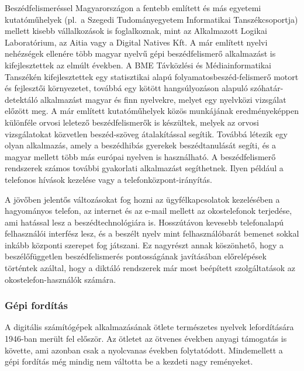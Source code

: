 \begin{multicols}{2}
  Beszédfelismeréssel Magyarországon a fentebb említett és más egyetemi ku\-ta\-tó\-mű\-he\-lyek (pl.~a Szegedi Tu\-do\-mány\-egye\-tem Informatikai Tanszékcsoportja) mellett kisebb vállalkozások is foglalkoznak, mint az Alkalmazott Logikai La\-bo\-ra\-tó\-ri\-um, az Aitia vagy a Digital Natives Kft. A már említett nyelvi nehézségek ellenére több magyar nyelvű gépi beszédfelismerő alkalmazást is kifejlesztettek az elmúlt években. A BME Távközlési és Mé\-dia\-in\-for\-ma\-ti\-kai Tanszékén kifejlesztettek egy statisztikai alapú folyamatosbeszéd-felismerő motort és fejlesztői környezetet, továbbá egy kötött hangsúlyozáson alapuló szóhatár-detektáló alkalmazást ma\-gyar és finn nyelvekre, melyet egy nyelv\-kö\-zi vizsgálat előzött meg. A már említett kutatóműhelyek közös munkájának eredményeképpen különféle orvosi leletező beszédfelismerők is készültek, melyek az orvosi vizsgálatokat közvetlen beszéd-szöveg átalakítással segítik. Továbbá létezik egy olyan alkalmazás, amely a beszédhibás gyerekek beszédtanulását se\-gí\-ti, és a magyar mellett több más európai nyelven is használható. A beszédfelismerő rendszerek számos további gyakorlati alkalmazást segíthetnek. Ilyen például a telefonos hívások kezelése vagy a te\-le\-fon\-köz\-pont-irányítás.

  A jövőben jelentős változásokat fog hozni az ügyfélkapcsolatok kezelésében a ha\-gyo\-má\-nyos telefon, az internet és az e-mail mellett az okostelefonok terjedése, ami hatással lesz a beszédtechnológiára is. Hosszútávon kevesebb telefonalapú felhasználói interfész lesz, és a beszélt nyelv mint felhasználóbarát bemenet sokkal inkább központi szerepet fog játszani. Ez nagyrészt annak köszönhető, hogy a beszélőfüggetlen beszédfelismerés pontosságának javításában előrelépések tör\-tén\-tek azáltal, hogy a diktáló rend\-sze\-rek már most beépített szolgáltatások az okostelefon-használók számára.

  \subsubsection{Gépi fordítás}

  A digitális számítógépek alkalmazásának ötlete természetes nyelvek lefordítására 1946-ban merült fel először. Az ötletet az ötvenes években anyagi támogatás is követte, ami azonban csak a nyolcvanas években folytatódott. Mindemellett a gépi fordítás még mindig nem váltotta be a kezdeti nagy reményeket.



\end{multicols}
